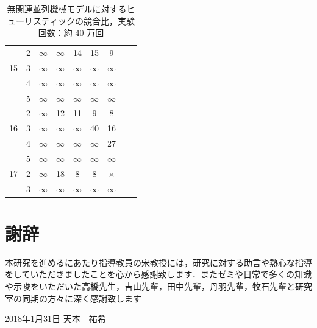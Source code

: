 \documentclass[12pt]{optlab-bachelor}
\def\氏名{天本　祐希}
\begin{document}
\begin{table}[htb]
\begin{center}
\begin{tabular}{|c|c|c|c|c|c|c|c|c|}
      & 2 & $\infty$ & $\infty$ & 14 & 15 & 9 \\ \cline{2-7}
      15 & 3 & $\infty$ & $\infty$ & $\infty$ & $\infty$ & $\infty$ \\ \cline{2-7}
      & 4 & $\infty$ & $\infty$ & $\infty$ & $\infty$ & $\infty$ \\ \cline{2-7}
      & 5 & $\infty$ & $\infty$ & $\infty$ & $\infty$ & $\infty$ \\ \hline \hline

      & 2 & $\infty$ & 12 & 11 & 9 & 8 \\ \cline{2-7}
      16 & 3 & $\infty$ & $\infty$ & $\infty$ & 40 & 16 \\ \cline{2-7}
      & 4 & $\infty$ & $\infty$ & $\infty$ & $\infty$ & 27 \\ \cline{2-7}
      & 5 & $\infty$ & $\infty$ & $\infty$ & $\infty$ & $\infty$ \\ \hline \hline

      17 & 2 & $\infty$ & 18 & 8 & 8 & $\times$ \\ \cline{2-7}
      & 3 & $\infty$ & $\infty$ & $\infty$ & $\infty$ & $\infty$ \\  \hline \hline
    \end{tabular}
    \caption{無関連並列機械モデルに対するヒューリスティックの競合比，実験回数：約 40 万回}
    \label{A6}
  \end{center}
\end{table}

\chapter*{謝辞}
本研究を進めるにあたり指導教員の宋教授には，研究に対する助言や熱心な指導をしていただきましたことを心から感謝致します．またゼミや日常で多くの知識や示唆をいただいた高橋先生，吉山先輩，田中先輩，丹羽先輩，牧石先輩と研究室の同期の方々に深く感謝致します

\begin{flushright}
  2018年1月31日 \氏名
\end{flushright}
\endmatter
\end{document}
